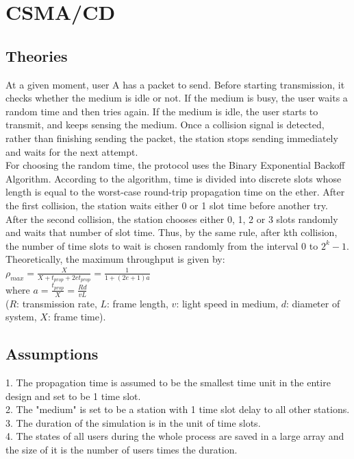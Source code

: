\documentclass[11pt,a4paper]{report}
\begin{document}
\section*{CSMA/CD}
\subsection*{Theories}
At a given moment, user A has a packet to send. Before starting transmission, it checks whether the medium is idle or not. If the medium is busy, the user waits a random time and then tries again. If the medium is idle, the user starts to transmit, and keeps sensing the medium. Once a collision signal is detected, rather than finishing sending the packet, the station stops sending immediately and waits for the next attempt. \\

For choosing the random time, the protocol uses the Binary Exponential Backoff Algorithm. According to the algorithm, time is divided into discrete slots whose length is equal to the worst-case round-trip propagation time on the ether. After the first collision, the station waits either 0 or 1 slot time before another try. After the second collision, the station chooses either 0, 1, 2 or 3 slots randomly and waits that number of slot time. Thus, by the same rule, after kth collision, the number of time slots to wait is chosen randomly from the interval 0 to \(2^k-1\). \\

Theoretically, the maximum throughput is given by: \\

\qquad \(\rho_{max} = \frac{X}{X+t_{prop}+2et_{prop}} = \frac{1}{1+(2e+1)a}\) \\
where \(a = \frac{t_{prop}}{X} = \frac{Rd}{vL}\) \\
(\(R\): transmission rate, \(L\): frame length, \(v\): light speed in medium, \(d\): diameter of system, \(X\): frame time).

\subsection*{Assumptions}
1. The propagation time is assumed to be the smallest time unit in the entire design and set to be 1 time slot. \\
2. The "medium" is set to be a station with 1 time slot delay to all other stations. \\
3. The duration of the simulation is in the unit of time slots. \\
4. The states of all users during the whole process are saved in a large array and the size of it is the number of users times the duration.
\end{document}

